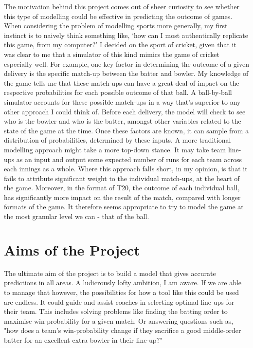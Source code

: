 The motivation behind this project comes out of sheer curiosity to see whether this type of modelling could be effective in predicting the outcome of games. When considering the problem of modelling sports more generally, my first instinct is to naively think something like, ‘how can I most authentically replicate this game, from my computer?’ I decided on the sport of cricket, given that it was clear to me that a simulator of this kind mimics the game of cricket especially well. For example, one key factor in determining the outcome of a given delivery is the specific match-up between the batter and bowler. My knowledge of the game tells me that these match-ups can have a great deal of impact on the respective probabilities for each possible outcome of that ball. A ball-by-ball simulator accounts for these possible match-ups in a way that's superior to any other approach I could think of. Before each delivery, the model will check to see who is the bowler and who is the batter, amongst other variables related to the state of the game at the time. Once these factors are known, it can sample from a distribution of probabilities, determined by these inputs. A more traditional modelling approach might take a more top-down stance. It may take team line-ups as an input and output some expected number of runs for each team across each innings as a whole. Where this approach falls short, in my opinion, is that it fails to attribute significant weight to the individual match-ups, at the heart of the game. Moreover, in the format of T20, the outcome of each individual ball, has significantly more impact on the result of the match, compared with longer formats of the game. It therefore seems appropriate to try to model the game at the most granular level we can - that of the ball.

\section{Aims of the Project}

The ultimate aim of the project is to build a model that gives accurate predictions in all areas. A ludicrously lofty ambition, I am aware. If we are able to manage that however, the possibilities for how a tool like this could be used are endless. It could guide and assist coaches in selecting optimal line-ups for their team. This includes solving problems like finding the batting order to maximise win-probability for a given match. Or answering questions such as, "how does a team's win-probability change if they sacrifice a good middle-order batter for an excellent extra bowler in their line-up?"

